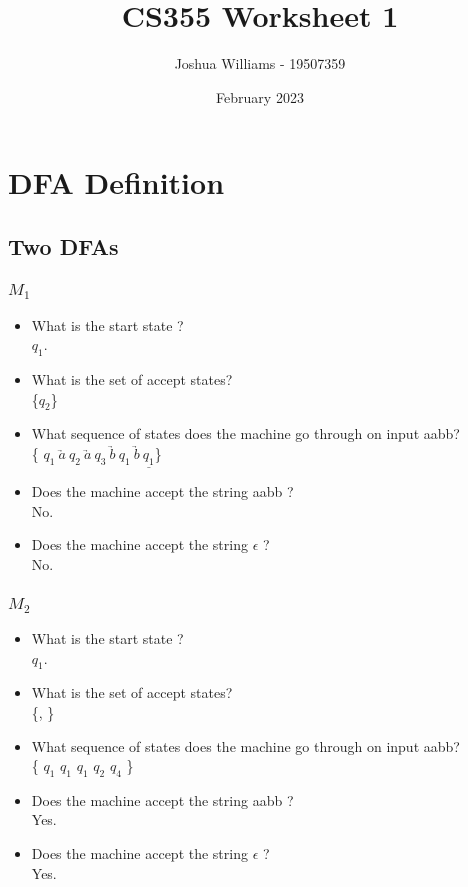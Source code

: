 \documentclass{article}
\title{CS355 Worksheet 1}
\author{Joshua Williams - 19507359}
\date{February 2023}
\begin{document}
\maketitle

\section{DFA Definition}
\subsection{Two DFAs}
\subsubsection{$M_1$}

\begin{itemize}
  \item What is the start state ?\\ $q_1$.
  
  \item What is the set of accept states?\\ \{\:$q_2$\:\}
  
  \item What sequence of states does the machine go through on input aabb?\\ \{ $q_1 \:\underrightarrow{a} \:q_2 \:\underrightarrow{a} \:q_3 \:\underrightarrow{b} \:q_1 
  \:\underrightarrow{b} \:\underline{q_1}$\:\}
  
  \item Does the machine accept the string aabb ?\\ No.
  \item Does the machine accept the string $\epsilon$ \:?\\ No.
  
\end{itemize}

\subsubsection{$M_2$}
\begin{itemize}
  \item What is the start state ?\\ {$q_1$}.
  
  \item What is the set of accept states?\\ \{, \:\}
  
  \item What sequence of states does the machine go through on input aabb?\\ \{ {$q_1$ \: \:$q_1$ \: \:$q_1$ \: \:$q_2$ 
  \: \:\underline{$q_4$}} \: \}
  
  \item Does the machine accept the string aabb ?\\ Yes.
  
  \item Does the machine accept the string $\epsilon$ \:?\\ Yes.
\end{itemize}
\end{document}
